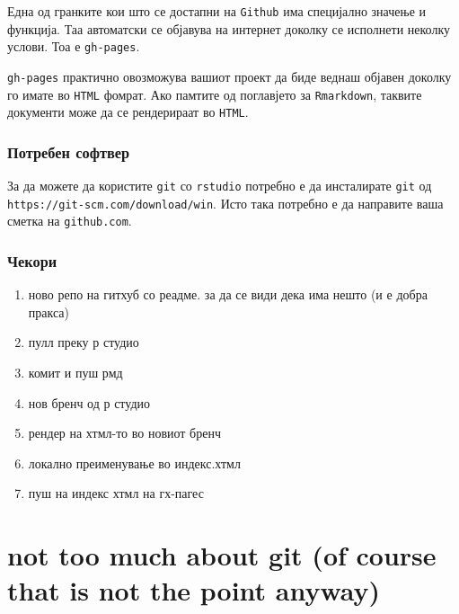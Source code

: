 \documentclass[
]{book}
\begin{document}
Една од гранките кои што се достапни на \texttt{Github} има специјално значење и функција. Таа автоматски се објавува на интернет доколку се исполнети неколку услови. Тоа е \texttt{gh-pages}.

\texttt{gh-pages} практично овозможува вашиот проект да биде веднаш објавен доколку го имате во \texttt{HTML} фомрат. Ако памтите од поглавјето за \texttt{Rmarkdown}, таквите документи може да се рендерираат во \texttt{HTML}.

\hypertarget{ux43fux43eux442ux440ux435ux431ux435ux43d-ux441ux43eux444ux442ux432ux435ux440}{%
\subsection{Потребен софтвер}\label{ux43fux43eux442ux440ux435ux431ux435ux43d-ux441ux43eux444ux442ux432ux435ux440}}

За да можете да користите \texttt{git} со \texttt{rstudio} потребно е да инсталирате \texttt{git} од \texttt{https://git-scm.com/download/win}. Исто така потребно е да направите ваша сметка на \texttt{github.com}.

\hypertarget{ux447ux435ux43aux43eux440ux438}{%
\subsection{Чекори}\label{ux447ux435ux43aux43eux440ux438}}

\begin{enumerate}
\def\labelenumi{\arabic{enumi}.}
\item
  ново репо на гитхуб со реадме. за да се види дека има нешто (и е добра пракса)
\item
  пулл преку р студио
\item
  комит и пуш рмд
\item
  нов бренч од р студио
\item
  рендер на хтмл-то во новиот бренч
\item
  локално преименување во индекс.хтмл
\item
  пуш на индекс хтмл на гх-пагес
\end{enumerate}

\hypertarget{not-too-much-about-git-of-course-that-is-not-the-point-anyway}{%
\chapter{not too much about git (of course that is not the point anyway)}\label{not-too-much-about-git-of-course-that-is-not-the-point-anyway}}
\end{document}
